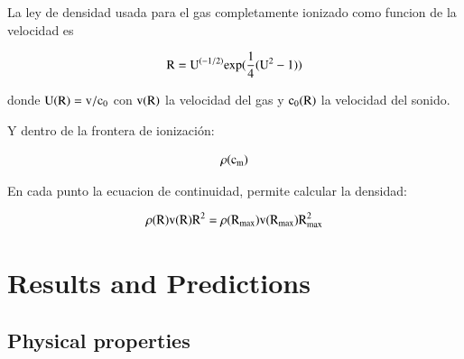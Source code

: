 \documentclass{article}
\begin{document}
La ley de densidad usada para el gas completamente ionizado como funcion de la velocidad es

\begin{equation}
  \rm R = U^{(-1/2)} exp (\frac{1}{4} (U^2 -1))
\end{equation}

donde $\rm U(R) = v / c_0$ con $\rm v(R)$ la velocidad del gas y $\rm c_0(R)$ la velocidad del sonido.



Y dentro de la frontera de ionización:

\begin{equation}
  \rm \rho(c_m)
\end{equation}

En cada punto la ecuacion de continuidad, permite calcular la densidad:

\begin{equation}
  \rm \rho (R) v(R) R^2 = \rho (R_{max}) v(R_{max}) R_{max}^2
\end{equation}

\section{Results and Predictions}
\label{sec:results}



\subsection{Physical properties}
\label{sec:physical}
\end{document}
